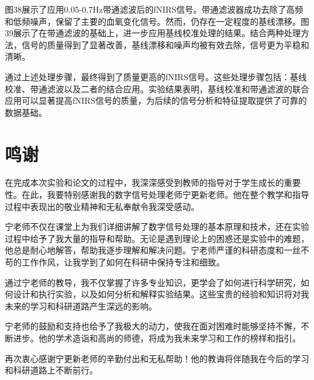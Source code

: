 \documentclass[a4paper,12pt]{article}
\begin{document}
图38展示了应用0.05-0.7Hz带通滤波后的fNIRS信号。带通滤波器成功去除了高频和低频噪声，保留了主要的血氧变化信号。然而，仍存在一定程度的基线漂移。图39展示了在带通滤波的基础上，进一步应用基线校准处理的结果。结合两种处理方法，信号的质量得到了显著改善，基线漂移和噪声均被有效去除，信号更为平稳和清晰。

通过上述处理步骤，最终得到了质量更高的fNIRS信号。这些处理步骤包括：基线校准、带通滤波以及二者的结合应用。实验结果表明，基线校准和带通滤波的联合应用可以显著提高fNIRS信号的质量，为后续的信号分析和特征提取提供了可靠的数据基础。

\newpage
\section{鸣谢}
在完成本次实验和论文的过程中，我深深感受到教师的指导对于学生成长的重要性。在此，我要特别感谢我的数字信号处理老师宁更新老师。他在整个教学和指导过程中表现出的敬业精神和无私奉献令我深受感动。

宁老师不仅在课堂上为我们详细讲解了数字信号处理的基本原理和技术，还在实验过程中给予了我大量的指导和帮助。无论是遇到理论上的困惑还是实验中的难题，他总是耐心地解答，帮助我逐步理解和解决问题。宁老师严谨的科研态度和一丝不苟的工作作风，让我学到了如何在科研中保持专注和细致。

通过宁老师的教导，我不仅掌握了许多专业知识，更学会了如何进行科学研究，如何设计和执行实验，以及如何分析和解释实验结果。这些宝贵的经验和知识将对我未来的学习和科研道路产生深远的影响。

宁老师的鼓励和支持也给予了我极大的动力，使我在面对困难时能够坚持不懈，不断进步。他的学术造诣和高尚的师德，将成为我未来学习和工作的榜样和指引。

再次衷心感谢宁更新老师的辛勤付出和无私帮助！他的教诲将伴随我在今后的学习和科研道路上不断前行。
\newpage


\end{document}
